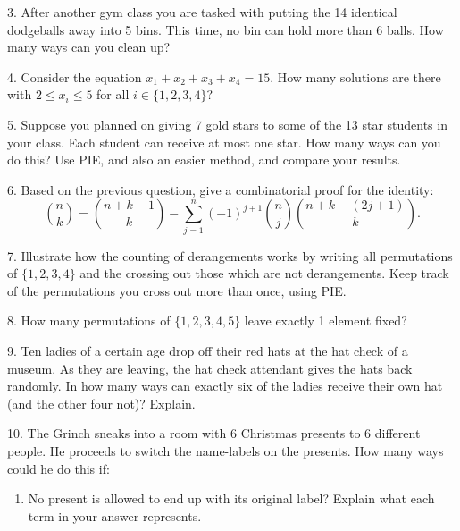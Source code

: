 \documentclass[10pt,]{book}
\theoremstyle{plain}
\theoremstyle{definition}
\numberwithin{equation}{chapter}
\begin{document}
\begin{exerciselist}
\par\smallskip
\item[3.]\hypertarget{exercise-108}{}
            After another gym class you are tasked with putting the 14 identical dodgeballs away into 5 bins. This time, no bin can hold more than 6 balls. How many ways can you clean up?
\par\smallskip
\item[4.]\hypertarget{exercise-109}{}
            Consider the equation \(x_1 + x_2 + x_3 + x_4 = 15\). How many solutions are there with \(2 \le x_i \le 5\) for all \(i \in \{1,2,3,4\}\)?
\par\smallskip
\item[5.]\hypertarget{exercise-110}{}
            Suppose you planned on giving 7 gold stars to some of the 13 star students in your class. Each student can receive at most one star. How many ways can you do this? Use PIE, and also an easier method, and compare your results.
\par\smallskip
\item[6.]\hypertarget{exercise-111}{}
            Based on the previous question, give a combinatorial proof for the identity:
            \begin{equation*}
              {n \choose k} = {n+k-1 \choose k} - \sum_{j=1}^n (-1)^{j+1}{n \choose j}{n+k-(2j+1) \choose k}.
            \end{equation*}
\par\smallskip
\item[7.]\hypertarget{exercise-112}{}
            Illustrate how the counting of derangements works by writing all permutations of \(\{1,2,3,4\}\) and the crossing out those which are not derangements. Keep track of the permutations you cross out more than once, using PIE.
\par\smallskip
\item[8.]\hypertarget{exercise-113}{}
            How many permutations of \(\{1,2,3,4,5\}\) leave exactly 1 element fixed?
\par\smallskip
\item[9.]\hypertarget{exercise-114}{}
            Ten ladies of a certain age drop off their red hats at the hat check of a museum. As they are leaving, the hat check attendant gives the hats back randomly. In how many ways can exactly six of the ladies receive their own hat (and the other four not)?  Explain.
\par\smallskip
\item[10.]\hypertarget{exercise-115}{}
            The Grinch sneaks into a room with 6 Christmas presents to 6 different people. He proceeds to switch the name-labels on the presents. How many ways could he do this if:
          \leavevmode%
\begin{enumerate}[label=(\alph*)]
\item\hypertarget{li-363}{}
                No present is allowed to end up with its original label? Explain what each term in your answer represents.



\end{enumerate}
\end{exerciselist}
\end{document}
